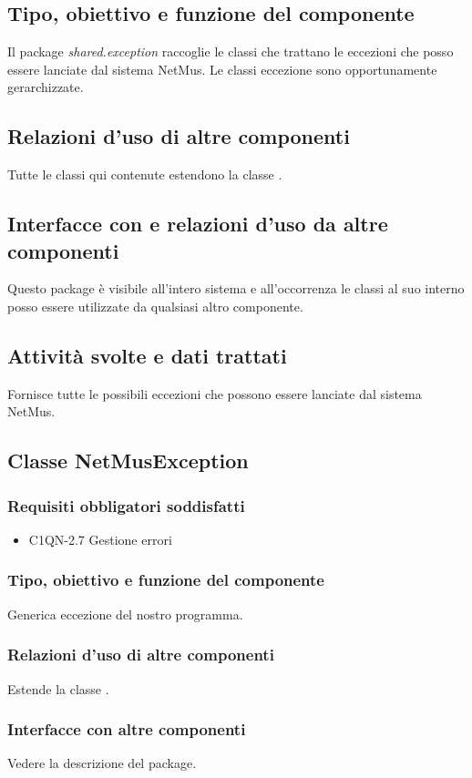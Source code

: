\subsection*{Tipo, obiettivo e funzione del componente}
Il package \emph{shared.exception} raccoglie le classi che trattano
le eccezioni che posso essere lanciate dal sistema NetMus. Le classi eccezione
sono opportunamente gerarchizzate. 
\subsection*{Relazioni d'uso di altre componenti}
Tutte le classi qui contenute estendono la classe .
\subsection*{Interfacce con e relazioni d'uso da altre componenti}
Questo package \`e visibile all'intero sistema e all'occorrenza le classi al suo
interno posso essere utilizzate da qualsiasi altro componente.
\subsection*{Attivit\`a svolte e dati trattati}
Fornisce tutte le possibili eccezioni che possono essere lanciate dal sistema
NetMus.

\subsection{Classe NetMusException}
\subsubsection*{Requisiti obbligatori soddisfatti}
\begin{itemize}
	\item C1QN-2.7 Gestione errori
\end{itemize}
\subsubsection*{Tipo, obiettivo e funzione del componente}
Generica eccezione del nostro programma.
\subsubsection*{Relazioni d'uso di altre componenti}
Estende la classe .
\subsubsection*{Interfacce con altre componenti}
Vedere la descrizione del package.
